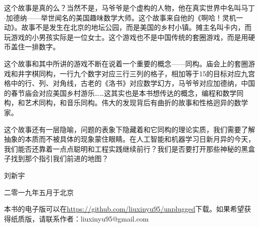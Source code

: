 \documentclass[UTF8]{article}
\begin{document}
这个故事是真的么？当然不是，马爷爷是个虚构的人物，他在真实世界中名叫马丁$\cdot$加德纳——举世闻名的美国趣味数学大师。这个故事来自他的《啊哈！灵机一动》。故事不是发生在北京的地坛公园，而是美国的乡村小镇。摊主名叫卡内，而玩游戏的小男孩实际是一位女士。这个游戏也不是中国传统的套圈游戏，而是用硬币盖住一排数字。

这个故事和其中所讲的游戏不断在说着一个重要的概念——同构。庙会上的套圈游戏和井字棋同构，一行九个数字对应三行三列的格子，相加等于15的目标对应九宫格中的行、列、对角线，古老的《洛书》对应数学幻方，马爷爷对应加德纳，中国的春节庙会对应美国乡村游乐……这其实也是本书想传达的概念，编程和数学同构，和艺术同构，和音乐同构。伟大的发现背后有曲折的故事和性格迥异的数学家。

这个故事还有一层隐喻，问题的表象下隐藏着和它同构的理论实质，我们需要了解抽象的本质而不被具体的现象蒙住眼睛。在人工智能和机器学习日新月异的今天，我们能否还靠着一点点聪明和工程实践继续前行？我们是否要打开那些神秘的黑盒子找到那个指引我们前进的地图？

\vspace{15mm}

刘新宇

二零一九年五月于北京

\begin{Exercise}
\end{Exercise}

\vspace{10mm}

本书的电子版可以在\url{https://github.com/liuxinyu95/unplugged}下载。如果希望获得纸质版，请联系作者：liuxinyu95@gmail.com

\ifx\wholebook\relax \else

\expandafter\enddocument

\fi
\end{document}
